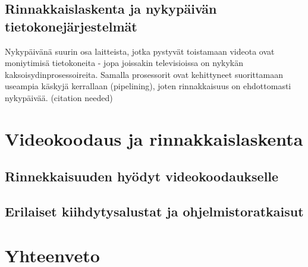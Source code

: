 \subsection{Rinnakkaislaskenta ja nykypäivän tietokonejärjestelmät}

Nykypäivänä suurin osa laitteista, jotka pystyvät toistamaan videota ovat
moniytimisä tietokoneita - jopa joissakin televisioissa on nykykän
kaksoisydinprosessoireita. Samalla prosessorit ovat kehittyneet suorittamaan
useampia käskyjä kerrallaan (pipelining), joten rinnakkaisuus on ehdottomasti
nykypäivää. (citation needed)

\newpage

\section{Videokoodaus ja rinnakkaislaskenta}

\newpage

\subsection{Rinnekkaisuuden hyödyt videokoodaukselle}

\newpage

\subsection{Erilaiset kiihdytysalustat ja ohjelmistoratkaisut}

\newpage

\section{Yhteenveto}



